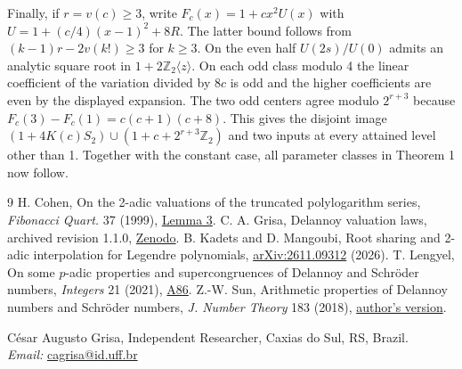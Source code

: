 \documentclass[11pt]{article}
\newcommand{\Z}{\mathbb Z_2}
\newcommand{\T}{\mathbb Z_2\langle z\rangle}
\begin{document}
Finally, if $r=v(c)\ge3$, write $F_c(x)=1+cx^2 U(x)$ with
$U=1+(c/4)(x-1)^2+8R$. The latter bound follows from $(k-1)r-2v(k!)\ge3$ for $k\ge3$. On the even half $U(2s)/U(0)$ admits an analytic square root in $1+2\T$. On each odd class modulo 4 the linear coefficient of the variation divided by $8c$ is odd and the higher coefficients are even by the displayed expansion. The two odd centers agree modulo $2^{r+3}$ because $F_c(3)-F_c(1)=c(c+1)(c+8)$. This gives the disjoint image
$(1+4K(c)S_2)\cup(1+c+2^{r+3}\Z)$ and two inputs at every attained level other than 1. Together with the constant case, all parameter classes in Theorem 1 now follow.
\begin{thebibliography}{9}
 H. Cohen, On the 2-adic valuations of the truncated polylogarithm series, \emph{Fibonacci Quart.} 37 (1999), \href{https://www.fq.math.ca/Scanned/37-2/cohen.pdf}{Lemma 3}.
 C. A. Grisa, Delannoy valuation laws, archived revision 1.1.0, \href{https://doi.org/10.5281/zenodo.24316985}{Zenodo}.
 B. Kadets and D. Mangoubi, Root sharing and 2-adic interpolation for Legendre polynomials, \href{https://arxiv.org/abs/2611.09312}{arXiv:2611.09312} (2026).
 T. Lengyel, On some $p$-adic properties and supercongruences of Delannoy and Schr\"oder numbers, \emph{Integers} 21 (2021), \href{https://math.colgate.edu/~integers/v86/v86.pdf}{A86}.
 Z.-W. Sun, Arithmetic properties of Delannoy numbers and Schr\"oder numbers, \emph{J. Number Theory} 183 (2018), \href{https://arxiv.org/abs/1602.00574}{author's version}.
\end{thebibliography}
\medskip
\noindent C\'esar Augusto Grisa, Independent Researcher, Caxias do Sul, RS, Brazil.\\
\textit{Email:} \href{mailto:cagrisa@id.uff.br}{cagrisa@id.uff.br}
\end{document}
